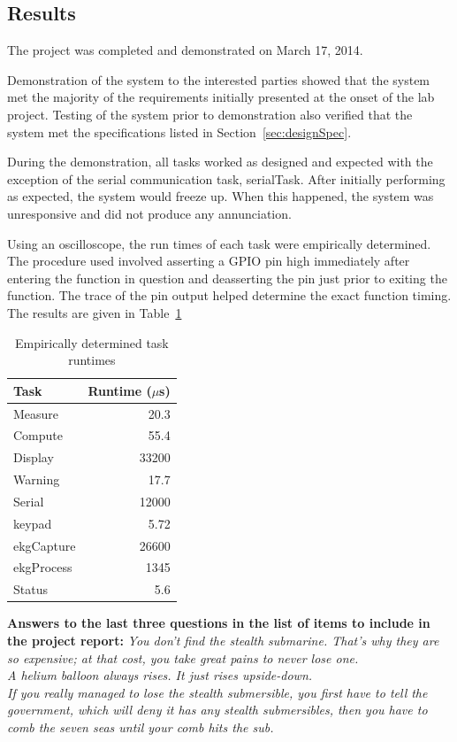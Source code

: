\documentclass[12pt]{article} %
\begin{document}
    \subsection{Results} 
    The project was completed and demonstrated on March 17, 2014.

    Demonstration of the system to the interested parties showed that the
    system met the majority of the requirements initially presented at the onset of the lab
    project.  Testing of the system prior to demonstration also verified that
    the system met the specifications listed in Section~\ref{sec:designSpec}.

    During the demonstration, all tasks worked as designed and expected with
    the exception of the serial communication task, serialTask. After initially
    performing as expected, the system would freeze up. When this happened, the
    system was unresponsive and did not produce any annunciation.

    Using an oscilloscope, the run times of each task were empirically
		determined. The procedure used involved asserting a GPIO pin high
		immediately after entering the function in question and deasserting the pin
		just prior to exiting the function. The trace of the pin output helped
		determine the exact function timing. The results are given in
		Table~\ref{tab:taskRuntimes}

    \begin{table}[h]
      \centering
      \begin{tabular}{|l|r|} 
	\hline
	Task & Runtime ($\mu$s) \\ \hline
	Measure & 20.3 \\ \hline
	Compute & 55.4 \\ \hline
	Display & 33200 \\ \hline
	Warning & 17.7 \\ \hline
    Serial & 12000 \\ \hline
    keypad & 5.72 \\ \hline
    ekgCapture & 26600 \\ \hline
    ekgProcess & 1345 \\ \hline
	Status & 5.6 \\ \hline
      \end{tabular}
      \caption{Empirically determined task runtimes}
      \label{tab:taskRuntimes}
    \end{table}

    \textbf{Answers to the last three questions in the list of items to include
    in the project report:}
    \emph{You don't find the stealth submarine. That's why they are so expensive; at that cost, you take great pains to never lose one.\\  A helium balloon always rises. It just rises upside-down. \\ If you really managed to lose the stealth submersible, you first have to tell the government, which will deny it has any stealth submersibles, then you have to comb the seven seas until your comb hits the sub.}
\end{document}
